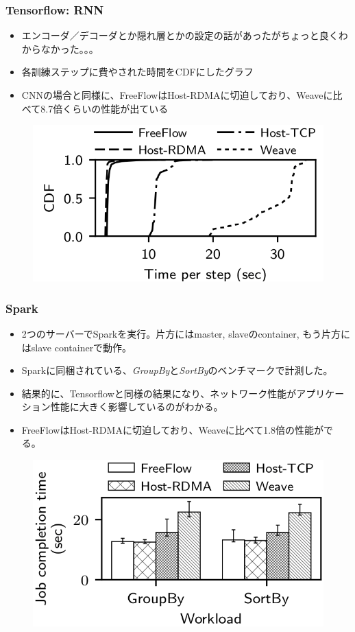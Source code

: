 \documentclass[dvipdfmx,9pt,notheorems]{beamer}
\theoremstyle{definition}
\begin{document}
\begin{frame}\frametitle{Tensorflow: RNN}
	\begin{itemize}
		\item エンコーダ／デコーダとか隠れ層とかの設定の話があったがちょっと良くわからなかった。。。
		\item 各訓練ステップに費やされた時間をCDFにしたグラフ
		\item CNNの場合と同様に、FreeFlowはHost-RDMAに切迫しており、Weaveに比べて8.7倍くらいの性能が出ている
	\end{itemize}
  \begin{figure}[htb]
    \centering
		\includegraphics[scale=1]{fig/figure15-b.png}
  \end{figure}
\end{frame}

\begin{frame}\frametitle{Spark}
	\begin{itemize}
		\item 2つのサーバーでSparkを実行。片方にはmaster, slaveのcontainer, もう片方にはslave containerで動作。
		\item Sparkに同梱されている、\textit{GroupBy}と\textit{SortBy}のベンチマークで計測した。
		\item 結果的に、Tensorflowと同様の結果になり、ネットワーク性能がアプリケーション性能に大きく影響しているのがわかる。
		\item FreeFlowはHost-RDMAに切迫しており、Weaveに比べて1.8倍の性能がでる。
	\end{itemize}
  \begin{figure}[htb]
    \centering
		\includegraphics[scale=1]{fig/figure16.png}
  \end{figure}
\end{frame}
\end{document}
